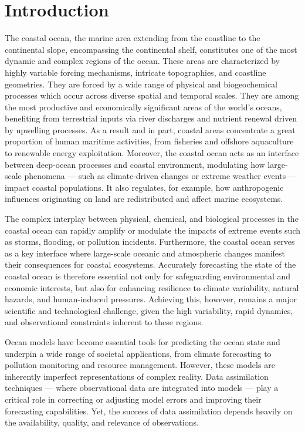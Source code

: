 \section{Introduction}


The coastal ocean, the marine area extending from the coastline to the
continental slope, encompassing the continental shelf, constitutes one
of the most dynamic and complex regions of the ocean. These areas are
characterized by highly variable forcing mechanisms, intricate
topographies, and coastline geometries. They are forced by a wide
range of physical and biogeochemical processes which occur across
diverse spatial and temporal scales. They are among the most
productive and economically significant areas of the world’s oceans,
benefiting from terrestrial inputs via river discharges and nutrient
renewal driven by upwelling processes. As a result and in part,
coastal areas concentrate a great proportion of human maritime
activities, from fisheries and offshore aquaculture to renewable
energy exploitation. Moreover, the coastal ocean acts as an interface
between deep-ocean processes and coastal environment, modulating how
large-scale phenomena — such as climate-driven changes or extreme
weather events — impact coastal populations. It also regulates, for
example, how anthropogenic influences originating on land are
redistributed and affect marine ecosystems.

The complex interplay between physical, chemical, and biological
processes in the coastal ocean can rapidly amplify or modulate the
impacts of extreme events such as storms, flooding, or pollution
incidents. Furthermore, the coastal ocean serves as a key interface
where large-scale oceanic and atmospheric changes manifest their
consequences for coastal ecosystems. Accurately forecasting the state
of the coastal ocean is therefore essential not only for safeguarding
environmental and economic interests, but also for enhancing
resilience to climate variability, natural hazards, and human-induced
pressures.  Achieving this, however, remains a major scientific and
technological challenge, given the high variability, rapid dynamics,
and observational constraints inherent to these regions.

Ocean models have become essential tools for predicting the ocean
state and underpin a wide range of societal applications, from climate
forecasting to pollution monitoring and resource management. However,
these models are inherently imperfect representations of complex
reality. Data assimilation techniques — where observational data are
integrated into models — play a critical role in correcting or
adjusting model errors and improving their forecasting
capabilities. Yet, the success of data assimilation depends heavily on
the availability, quality, and relevance of observations.

